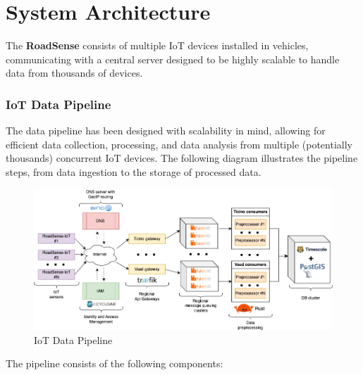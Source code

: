 \section{System Architecture}

The \textbf{RoadSense} consists of multiple IoT devices installed in vehicles, communicating with a central server designed to be highly scalable to handle data from thousands of devices.

\subsubsection{IoT Data Pipeline}

The data pipeline has been designed with scalability in mind, allowing for efficient data collection, processing, and data analysis from multiple (potentially thousands) concurrent IoT devices. The following diagram illustrates the pipeline steps, from data ingestion to the storage of processed data.

\begin{figure}[H]
	\centering
	\includegraphics[width=\textwidth]{../../assets/diagrams/iot_data_pipeline/iot_data_pipeline.png}
	\caption{IoT Data Pipeline}
\end{figure}

The pipeline consists of the following components:

